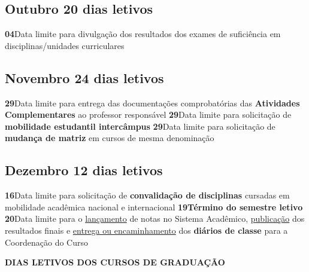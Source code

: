 \documentclass[thesis]{hmcposter}
\begin{document}
\begin{poster}
\subsection{Outubro \hfill 20 dias letivos}\textbf{04}\qquad Data limite para divulgação dos resultados dos exames de suficiência em disciplinas/unidades curriculares \newline \null\subsection{Novembro \hfill 24 dias letivos}\textbf{29}\qquad Data limite para entrega das documentações comprobatórias das \textbf{Atividades Complementares} ao professor responsável \newline \null\textbf{29}\qquad Data limite para solicitação de \textbf{mobilidade estudantil intercâmpus} \newline \null\textbf{29}\qquad Data limite para solicitação de \textbf{mudança de matriz} em cursos de mesma denominação \newline \null\subsection{Dezembro \hfill 12 dias letivos}\textbf{16}\qquad Data limite para solicitação de \textbf{convalidação de disciplinas} cursadas em mobilidade acadêmica nacional e internacional \newline \null\textbf{19}\qquad \textbf{Término do semestre letivo} \newline \null\textbf{20}\qquad Data limite para o \underline{lançamento} de notas no Sistema Acadêmico, \underline{publicação} dos resultados finais e \underline{entrega ou encaminhamento} dos \textbf{diários de classe} para a Coordenação do Curso \newline \null\newpage
~
\vfill
\begin{center}
\large \textbf{DIAS LETIVOS DOS CURSOS DE GRADUAÇÃO}
\newline
\null
\newline
\begin{table}
\centering
{}
\end{table}
\end{center}
\end{poster}
\end{document}
